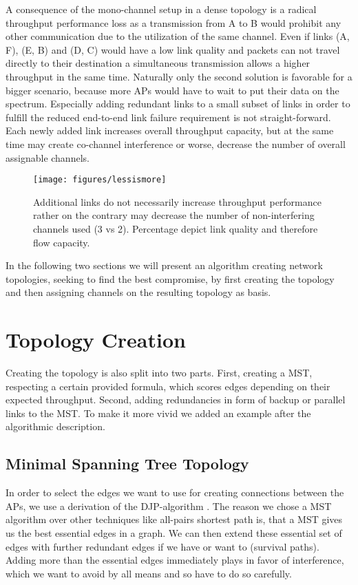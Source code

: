   A consequence of the mono-channel setup in a dense topology is a radical throughput performance loss as a transmission from
  A to B would prohibit any other communication due to the utilization of the same channel.
  Even if links (A, F), (E, B) and (D, C) would have a low link quality and packets can not travel directly to their destination
  a simultaneous transmission allows a higher throughput in the same time.
  Naturally only the second solution is favorable for a bigger scenario, because more APs would have to wait to put their data on the spectrum.
  Especially adding redundant links to a small subset of links in order to fulfill the reduced end-to-end link failure requirement is not straight-forward.
  Each newly added link increases overall throughput capacity, but at the same time may create co-channel interference or worse,
  decrease the number of overall assignable channels.
  
  \begin{figure}[h!]
    \centering
      \texttt{[image: figures/lessismore]}
      \caption{Additional links do not necessarily increase throughput performance rather on the contrary may decrease the number of non-interfering channels used (3 vs 2).
	Percentage depict link quality and therefore flow capacity.}
    \label{fig:lessismore}
  \end{figure}
  
  In the following two sections we will present an algorithm creating network topologies, seeking to find the best compromise,
  by first creating the topology and then assigning channels on the resulting topology as basis.
 
  \section{Topology Creation}
    Creating the topology is also split into two parts.
    First, creating a \ac{MST}, respecting a certain provided formula, which scores edges depending on their expected throughput.
    Second, adding redundancies in form of backup or parallel links to the \ac{MST}. 
    To make it more vivid we added an example after the algorithmic description.

    \subsection{Minimal Spanning Tree Topology}
      In order to select the edges we want to use for creating connections between the APs, we use a derivation of the \ac{DJP}-algorithm \cite{jarnik, prim}.
      The reason we chose a \ac{MST} algorithm over other techniques like all-pairs shortest path is, that a \ac{MST} gives us the best essential edges in a graph. 
      We can then extend these essential set of edges with further redundant edges if we have or want to (survival paths). 
      Adding more than the essential edges immediately plays in favor of interference, which we want to avoid by all means and so have to do so carefully.
      
